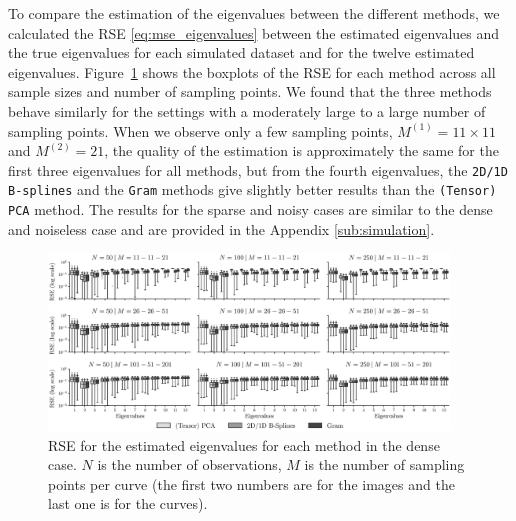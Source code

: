 \begin{results}
To compare the estimation of the eigenvalues between the different methods, we calculated the RSE \eqref{eq:mse_eigenvalues} between the estimated eigenvalues and the true eigenvalues for each simulated dataset and for the twelve estimated eigenvalues.
Figure~\ref{fig:logAE_mfd_1d} shows the boxplots of the RSE for each method across all sample sizes and number of sampling points. We found that the three methods behave similarly for the settings with a moderately large to a large number of sampling points. When we observe only a few sampling points, $M^{(1)} = 11 \times 11$ and $M^{(2)} = 21$, the quality of the estimation is approximately the same for the first three eigenvalues for all methods, but from the fourth eigenvalues, the \texttt{2D/1D B-splines} and the \texttt{Gram} methods give slightly better results than the \texttt{(Tensor) PCA} method. The results for the sparse and noisy cases are similar to the dense and noiseless case and are provided in the Appendix \ref{sub:simulation}.

\begin{figure}
    \centering
    \includegraphics[width=0.95\textwidth]{AE}
    \caption{RSE for the estimated eigenvalues for each method in the dense case. $N$ is the number of observations, $M$ is the number of sampling points per curve (the first two numbers are for the images and the last one is for the curves).}
    \label{fig:logAE_mfd_1d}
\end{figure}
\end{results}

